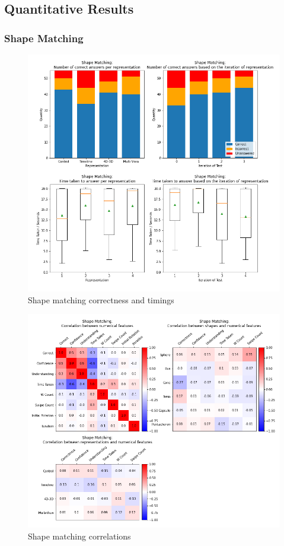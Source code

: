 \documentclass{l4proj}
\begin{document}
\subsection{Quantitative Results}

\subsubsection{Shape Matching}

\begin{figure}
  \includegraphics[width=\textwidth]{images/results/shape_matching_stats.png}
  \caption{Shape matching correctness and timings}
  \label{fig:shape_stats}
\end{figure}

\begin{figure}
  \includegraphics[width=\textwidth]{images/results/shape_matching_correlations.png}
  \caption{Shape matching correlations}
  \label{fig:shape_corr}
\end{figure}
\end{document}
